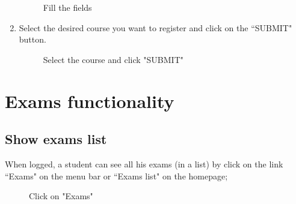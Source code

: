 \documentclass[ManualeUtente]{subfiles}
\begin{document}
\begin{enumerate}
\begin{figure}[H]
		\caption{Fill the fields}
		\label{fig:Fill the fields}
	\end{figure}
	\item Select the desired course you want to register and click on the \textquotedblleft SUBMIT" button.
	\begin{figure}[H]
		\centering
		\caption{Select the course and click "SUBMIT"}
		\label{fig:Select the course and click "SUBMIT"}
	\end{figure}
\end{enumerate}

\newpage
\section{Exams functionality}
\subsection{Show exams list}
When logged, a student can see all his exams (in a list) by click on the link \textquotedblleft Exams" on the menu bar or \textquotedblleft Exams list" on the homepage;
	\begin{figure}[H]
		\centering
		\caption{Click on "Exams"}
		\label{fig:Click on "Exams"}
	\end{figure}
\end{document}
